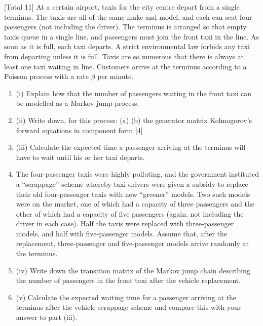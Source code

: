 \documentclass[a4paper,12pt]{article}
\begin{document}
[Total 11]
At a certain airport, taxis for the city centre depart from a single terminus. The taxis
are all of the same make and model, and each can seat four passengers (not including
the driver). The terminus is arranged so that empty taxis queue in a single line, and
passengers must join the front taxi in the line. As soon as it is full, each taxi departs.
A strict environmental law forbids any taxi from departing unless it is full. Taxis are
so numerous that there is always at least one taxi waiting in line.
Customers arrive at the terminus according to a Poisson process with a rate $\beta$ per
minute.
\begin{enumerate}
\item (i) Explain how that the number of passengers waiting in the front taxi can be
modelled as a Markov jump process.

\item (ii) Write down, for this process:
(a)
(b)
the generator matrix
Kolmogorov’s forward equations in component form
[4]
\item (iii)
Calculate the expected time a passenger arriving at the terminus will have to
wait until his or her taxi departs.
\item The four-passenger taxis were highly polluting, and the government instituted a
“scrappage” scheme whereby taxi drivers were given a subsidy to replace their old
four-passenger taxis with new “greener” models. Two such models were on the
market, one of which had a capacity of three passengers and the other of which had a
capacity of five passengers (again, not including the driver in each case). Half the
taxis were replaced with three-passenger models, and half with five-passenger
models.
Assume that, after the replacement, three-passenger and five-passenger models arrive
randomly at the terminus.
\item(iv) Write down the transition matrix of the Markov jump chain describing the
number of passengers in the front taxi after the vehicle replacement.

\item (v) Calculate the expected waiting time for a passenger arriving at the terminus
after the vehicle scrappage scheme and compare this with your answer to part
(iii).
\end{enumerate}
\end{document}
